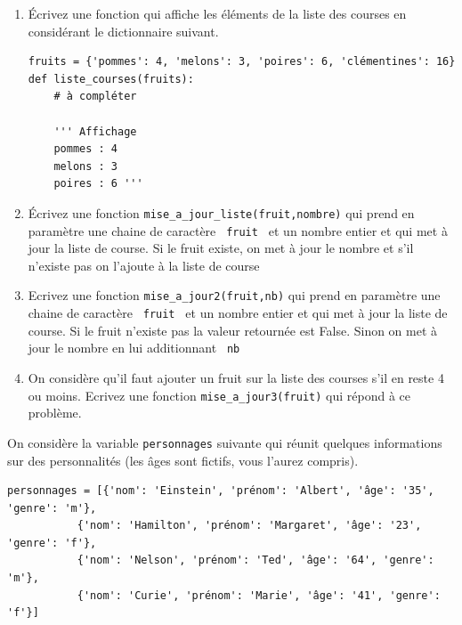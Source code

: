 \documentclass[a4paper,12pt,openany]{book}
\begin{document}
\bigskip

\exo 

\begin{enumerate}
	\item Écrivez une fonction qui affiche les éléments de la liste des courses en considérant le dictionnaire suivant.
	
	\begin{lstlisting}[numbers = none]
fruits = {'pommes': 4, 'melons': 3, 'poires': 6, 'clémentines': 16}
def liste_courses(fruits):
	# à compléter

	''' Affichage 
	pommes : 4
	melons : 3
	poires : 6 '''
\end{lstlisting}

	\item Écrivez une fonction \verb+mise_a_jour_liste(fruit,nombre)+ qui prend en paramètre une chaine de caractère \verb+ fruit + et un nombre entier et qui met à jour la liste de course. Si le fruit existe, on met à jour le nombre et s'il n'existe pas on l'ajoute à la liste de course
	\medskip
	
	\item Ecrivez une fonction \verb+mise_a_jour2(fruit,nb)+ qui prend en paramètre une chaine de caractère \verb+ fruit + et un nombre entier et qui met à jour la liste de course. Si le fruit n'existe pas la valeur retournée est False. Sinon on met à jour le nombre en lui additionnant \verb+ nb +
	\medskip
	
	\item On considère qu'il faut ajouter un fruit sur la liste des courses s'il en reste 4 ou moins. Ecrivez une fonction \verb+mise_a_jour3(fruit)+ qui répond à ce problème.
	\medskip
	
	
	
\end{enumerate}

\bigskip


\exo

On considère la variable \verb+personnages+ suivante qui réunit quelques informations sur des personnalités (les âges sont fictifs, vous l'aurez compris).

\begin{lstlisting}[numbers = none]
personnages = [{'nom': 'Einstein', 'prénom': 'Albert', 'âge': '35', 'genre': 'm'},
           {'nom': 'Hamilton', 'prénom': 'Margaret', 'âge': '23', 'genre': 'f'},
           {'nom': 'Nelson', 'prénom': 'Ted', 'âge': '64', 'genre': 'm'},
           {'nom': 'Curie', 'prénom': 'Marie', 'âge': '41', 'genre': 'f'}]
\end{lstlisting}
\end{document}
